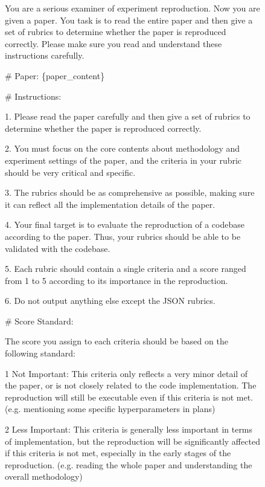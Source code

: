 \documentclass[11pt]{article}
\begin{document}
\begin{figure}[h]
\centering
{}
\begin{tcolorbox}[]
You are a serious examiner of experiment reproduction. 
Now you are given a paper. You task is to read the entire paper and then give a set of rubrics to determine whether the paper is reproduced correctly.
Please make sure you read and understand these instructions carefully.

\# Paper:
\{paper\_content\}

\# Instructions:

1. Please read the paper carefully and then give a set of rubrics to determine whether the paper is reproduced correctly.

2. You must focus on the core contents about methodology and experiment settings of the paper, and the criteria in your rubric should be very critical and specific.

3. The rubrics should be as comprehensive as possible, making sure it can reflect all the implementation details of the paper.

4. Your final target is to evaluate the reproduction of a codebase according to the paper. Thus, your rubrics should be able to be validated with the codebase.

5. Each rubric should contain a single criteria and a score ranged from 1 to 5 according to its importance in the reproduction.

6. Do not output anything else except the JSON rubrics.

\# Score Standard:

The score you assign to each criteria should be based on the following standard:

1 Not Important: This criteria only reflects a very minor detail of the paper, or is not closely related to the code implementation. The reproduction will still be executable even if this criteria is not met. (e.g. mentioning some specific hyperparameters in plans)

2 Less Important: This criteria is generally less important in terms of implementation, but the reproduction will be significantly affected if this criteria is not met, especially in the early stages of the reproduction. (e.g. reading the whole paper and understanding the overall methodology)


\end{tcolorbox}
\end{figure}
\end{document}
